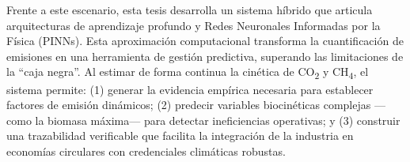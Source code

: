 Frente a este escenario, esta tesis desarrolla un sistema híbrido que articula arquitecturas de aprendizaje profundo y Redes Neuronales Informadas por la Física (PINNs). Esta aproximación computacional transforma la cuantificación de emisiones en una herramienta de gestión predictiva, superando las limitaciones de la ``caja negra''. Al estimar de forma continua la cinética de CO\textsubscript{2} y CH\textsubscript{4}, el sistema permite: (1) generar la evidencia empírica necesaria para establecer factores de emisión dinámicos; (2) predecir variables biocinéticas complejas —como la biomasa máxima— para detectar ineficiencias operativas; y (3) construir una trazabilidad verificable que facilita la integración de la industria en economías circulares con credenciales climáticas robustas.